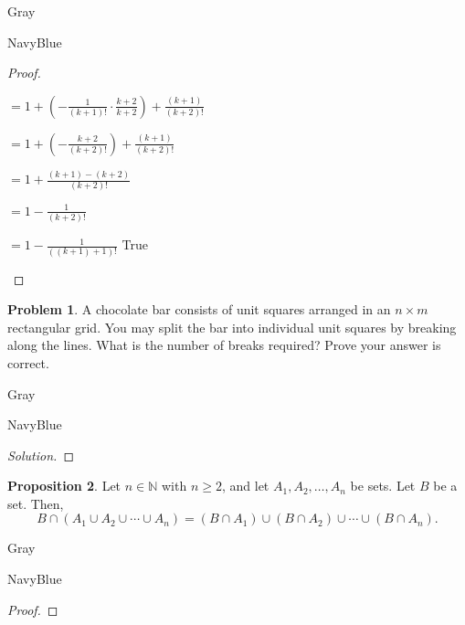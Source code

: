 \documentclass[12pt]{amsart}
\newcounter{problem_number}[section]
\theoremstyle{named}
\newenvironment{prf}
{\medskip\begin{color}{Gray}\begin{framed}\begin{color}{NavyBlue}\begin{proof}[Proof]
\doublespacing}
{\end{proof}\end{color}\end{framed}\end{color}\medskip}
\newenvironment{soln}
{\begin{color}{Gray}\begin{framed}\begin{color}{NavyBlue}\begin{proof}[Solution]
\doublespacing}
{\end{proof}\end{color}\end{framed}\end{color}}
\theoremstyle{definition}
\newtheorem{proposition}{Proposition}
\newtheorem{problem}[proposition]{Problem}
\newcommand{\N}{\mathbb N}
\begin{document}
\begin{prf}
\begin{adjustwidth}{2em}{0em}
		\vspace*{0.5em}

		\hspace*{8.105em}$\displaystyle = 1 + (- \frac{1}{(k+1)!} \cdot \frac{k+2}{k+2}) +\frac{(k+1)}{(k+2)!}$

		\vspace*{0.5em}

		\hspace*{8.105em}$\displaystyle = 1 + (- \frac{k+2}{(k+2)!}) +\frac{(k+1)}{(k+2)!}$

		\vspace*{0.5em}

		\hspace*{8.105em}$\displaystyle = 1 + \frac{(k+1) - (k+2)}{(k+2)!}$

		\vspace*{0.5em}

		\hspace*{8.105em}$\displaystyle = 1 - \frac{1}{(k+2)!}$

		\vspace*{0.5em}

		\hspace*{8.105em}$\displaystyle = 1 - \frac{1}{((k+1)+1)!}$ \hspace*{1em}\checkmark True
	\end{adjustwidth}
\end{prf}

\begin{problem}
	A chocolate bar consists of unit squares arranged in an $n\times m$ rectangular grid.
	You may split the bar into individual unit squares by breaking along the lines. What is the number of breaks required?
	Prove your answer is correct.
\end{problem}

\begin{soln}
	
\end{soln}


\begin{proposition}
	Let $n\in\N$ with $n\geq 2$, and let $A_1, A_2, \ldots, A_n$ be sets.
	Let $B$ be a set.
	Then,
	$$B\cap(A_1\cup A_2\cup \cdots\cup A_n) = (B\cap A_1)\cup (B\cap A_2) \cup \cdots \cup (B\cap A_n).$$
\end{proposition}

\begin{prf}
		
\end{prf}
\end{document}
